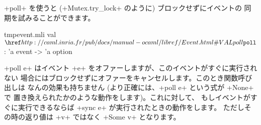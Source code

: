 \ml+poll+ を使うと (\ml+Mutex.try_lock+ のように) ブロックせずにイベントの
同期を試みることができます。
%
\begin{listingcodefile}{tmpevent.mli}
val $\indexlibvalue{Event}{poll}$ : 'a event -> 'a option
\end{listingcodefile}
%
\ml+poll e+ はイベント \ml+e+ をオファーしますが、このイベントがすぐに実行されない
場合にはブロックせずにオファーをキャンセルします。このとき関数呼び出しは
なんの効果も持ちません (より正確には、\ml+poll e+ という式が \ml+None+ で
置き換えられたかのような動作をします)。これに対して、
もしイベントがすぐに実行できるならば \ml+sync e+ が実行されたときの動作をします。
ただしその時の返り値は \ml+v+ ではなく \ml+Some v+ となります。


